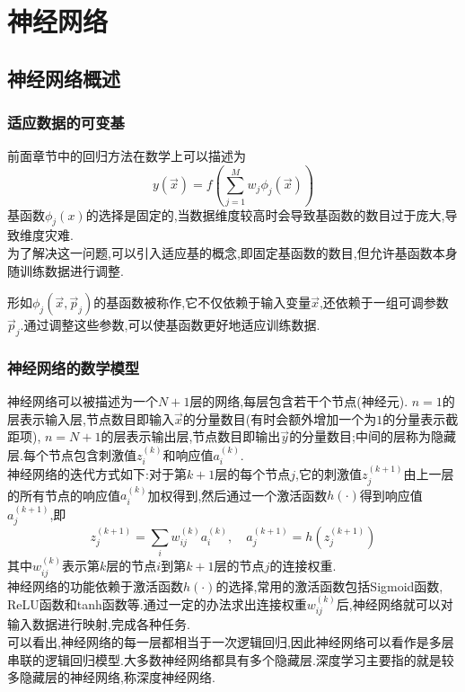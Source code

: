 \documentclass{ctexart}
\begin{document}
\setcounter{FormalCounter}{0}
\section{神经网络}
\subsection{神经网络概述}
\subsubsection{适应数据的可变基}
前面章节中的回归方法在数学上可以描述为
\[y\left(\vec{x}\right)=f\left(\sum_{j=1}^{M}w_j\phi_j(\vec{x})\right)\]
基函数$\phi_j(x)$的选择是固定的,当数据维度较高时会导致基函数的数目过于庞大,导致维度灾难.\\
\indent 为了解决这一问题,可以引入适应基的概念,即固定基函数的数目,但允许基函数本身随训练数据进行调整.
\begin{definition}[适应基]
    形如$\phi_j(\vec{x},\vec{p}_j)$的基函数被称作,它不仅依赖于输入变量$\vec{x}$,还依赖于一组可调参数$\vec{p}_j$.通过调整这些参数,可以使基函数更好地适应训练数据.
\end{definition}
\subsubsection{神经网络的数学模型}
神经网络可以被描述为一个$N+1$层的网络,每层包含若干个节点(神经元). $n=1$的层表示输入层,节点数目即输入$\vec{x}$的分量数目(有时会额外增加一个为$1$的分量表示截距项), $n=N+1$的层表示输出层,节点数目即输出$\vec{y}$的分量数目;中间的层称为隐藏层.每个节点包含刺激值$z^{(k)}_i$和响应值$a^{(k)}_i$.\\
\indent 神经网络的迭代方式如下:对于第$k+1$层的每个节点$j$,它的刺激值$z^{(k+1)}_j$由上一层的所有节点的响应值$a^{(k)}_i$加权得到,然后通过一个激活函数$h(\cdot)$得到响应值$a^{(k+1)}_j$,即
\[z^{(k+1)}_j=\sum_{i}w^{(k)}_{ij}a^{(k)}_i,\quad a^{(k+1)}_j=h\left(z^{(k+1)}_j\right)\]
其中$w^{(k)}_{ij}$表示第$k$层的节点$i$到第$k+1$层的节点$j$的连接权重.\\
\indent 神经网络的功能依赖于激活函数$h(\cdot)$的选择,常用的激活函数包括Sigmoid函数, ReLU函数和tanh函数等.通过一定的办法求出连接权重$w^{(k)}_{ij}$后,神经网络就可以对输入数据进行映射,完成各种任务.\\
\indent 可以看出,神经网络的每一层都相当于一次逻辑回归,因此神经网络可以看作是多层串联的逻辑回归模型.大多数神经网络都具有多个隐藏层.深度学习主要指的就是较多隐藏层的神经网络,称深度神经网络.
\end{document}

